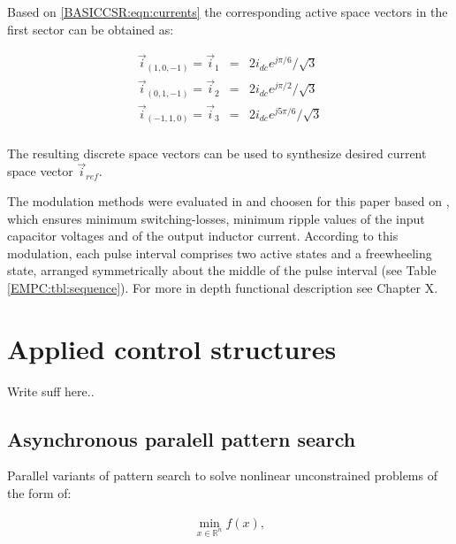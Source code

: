		Based on \ref{BASICCSR:eqn:currents} the corresponding active space vectors in the first sector can be obtained as:
		
		\begin{equation}
        \begin{array}{rcl}
            \vec{i}_{(1,0,-1)}=\vec{i}_1&=&2i_{dc}e^{j\pi/6}/\sqrt{3}\\
						\vec{i}_{(0,1,-1)}=\vec{i}_2&=&2i_{dc}e^{j\pi/2}/\sqrt{3}\\
						\vec{i}_{(-1,1,0)}=\vec{i}_3&=&2i_{dc}e^{j5\pi/6}/\sqrt{3}\\
        \end{array}
        \label{BASICCSR:eqn:currents}
    \end{equation}
		
		The resulting discrete space vectors can be used to synthesize desired current
space vector $\vec{i}_{ref}$. 

The modulation methods were evaluated in and choosen for this paper based on \cite{moussaoui2005open}, which ensures minimum switching-losses, minimum ripple values of the input capacitor voltages and of the output inductor current. According to this modulation, each pulse interval comprises two active states and a freewheeling state, arranged symmetrically about the middle of the pulse interval (see Table \ref{EMPC:tbl:sequence}). For more in depth functional description see Chapter X.

\section{Applied control structures}

Write suff here..

\subsection{Asynchronous paralell pattern search}\label{BASICUNB:sec:APPS}

Parallel variants of pattern search to solve nonlinear unconstrained problems of the form of:

\begin{equation}
        \begin{array}{rcl}
            \min_{x\in\mathbb{R}^n}f(x),\\
        \end{array}
        \label{BASICCSR:eqn:currents}
    \end{equation}
		
